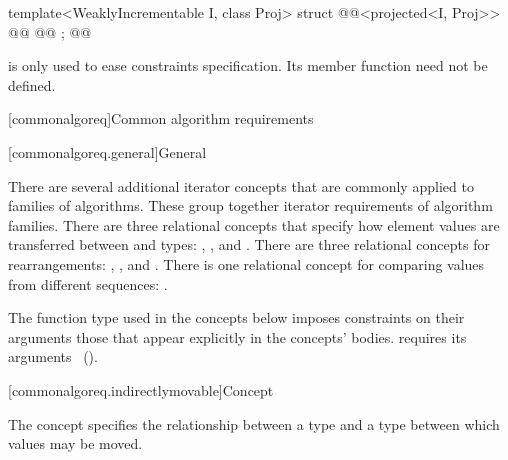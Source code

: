 \begin{addedblock}
\begin{codeblock}
  template<WeaklyIncrementable I, class Proj>
  struct @@<projected<I, Proj>> {
    @@
    @@
  };
@\newtxt{\}}@
\end{codeblock}

\pnum
\begin{note}
 is only used to ease constraints specification. Its
member function need not be defined.
\end{note}

[commonalgoreq]{Common algorithm requirements}

[commonalgoreq.general]{General}

\pnum
There are several additional iterator concepts that are commonly applied to families of algorithms.
These group together iterator requirements of algorithm families. There are three relational
concepts that specify how element values are transferred between  and  types:
, , and . There are three relational concepts
for rearrangements: , , and .
There is one relational concept for comparing values from different sequences: .

\pnum
\begin{note}
The 
 function 
type used in the concepts below imposes  constraints on their
arguments   those that appear explicitly
in the concepts' bodies.  
requires its arguments  
~().
\end{note}

[commonalgoreq.indirectlymovable]{Concept }

\pnum
The  concept specifies the relationship between a 
type and a  type between which values may be moved.


\end{addedblock}
